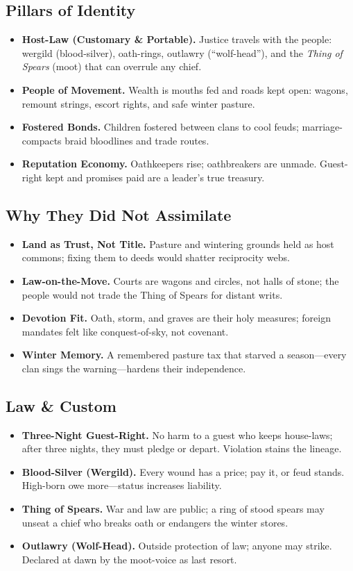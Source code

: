 \documentclass[11pt,letterpaper]{article}
\begin{document}
\subsection*{Pillars of Identity}
\begin{itemize}
  \item \textbf{Host-Law (Customary \& Portable).} Justice travels with the people: wergild (blood-silver), oath-rings, outlawry (``wolf-head''), and the \emph{Thing of Spears} (moot) that can overrule any chief.
  \item \textbf{People of Movement.} Wealth is mouths fed and roads kept open: wagons, remount strings, escort rights, and safe winter pasture.
  \item \textbf{Fostered Bonds.} Children fostered between clans to cool feuds; marriage-compacts braid bloodlines and trade routes.
  \item \textbf{Reputation Economy.} Oathkeepers rise; oathbreakers are unmade. Guest-right kept and promises paid are a leader's true treasury.
\end{itemize}

\subsection*{Why They Did Not Assimilate}
\begin{itemize}
  \item \textbf{Land as Trust, Not Title.} Pasture and wintering grounds held as host commons; fixing them to deeds would shatter reciprocity webs.
  \item \textbf{Law-on-the-Move.} Courts are wagons and circles, not halls of stone; the people would not trade the Thing of Spears for distant writs.
  \item \textbf{Devotion Fit.} Oath, storm, and graves are their holy measures; foreign mandates felt like conquest-of-sky, not covenant.
  \item \textbf{Winter Memory.} A remembered pasture tax that starved a season---every clan sings the warning---hardens their independence.
\end{itemize}

\subsection*{Law \& Custom}
\begin{itemize}
  \item \textbf{Three-Night Guest-Right.} No harm to a guest who keeps house-laws; after three nights, they must pledge or depart. Violation stains the lineage.
  \item \textbf{Blood-Silver (Wergild).} Every wound has a price; pay it, or feud stands. High-born owe more---status increases liability.
  \item \textbf{Thing of Spears.} War and law are public; a ring of stood spears may unseat a chief who breaks oath or endangers the winter stores.
  \item \textbf{Outlawry (Wolf-Head).} Outside protection of law; anyone may strike. Declared at dawn by the moot-voice as last resort.
\end{itemize}
\end{document}
